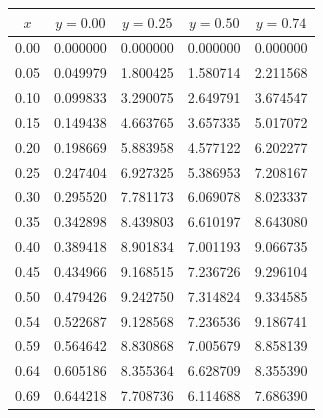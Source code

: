 \documentclass[aps,amsmath,amssymb,floatfix]{revtex4}
\begin{document}
\begin{enumerate}
\begin{enumerate}
\begin{table}[H]
\begin{tabular}{|c|c|c|c|c|}
	      	      		\textbf{$x$} & \textbf{$y = 0.00$} & \textbf{$y = 0.25$} & \textbf{$y = 0.50$} & \textbf{$y = 0.74$} \\ \hline
	      	      		0.00& 0.000000            & 0.000000            & 0.000000            & 0.000000\\ \hline
	      	      		0.05         & 0.049979            & 1.800425            & 1.580714            & 2.211568            \\ \hline
	      	      		0.10         & 0.099833            & 3.290075            & 2.649791            & 3.674547            \\ \hline
	      	      		0.15         & 0.149438            & 4.663765            & 3.657335            & 5.017072            \\ \hline
	      	      		0.20         & 0.198669            & 5.883958            & 4.577122            & 6.202277            \\ \hline
	      	      		0.25         & 0.247404            & 6.927325            & 5.386953            & 7.208167            \\ \hline
	      	      		0.30         & 0.295520            & 7.781173            & 6.069078            & 8.023337            \\ \hline
	      	      		0.35         & 0.342898            & 8.439803            & 6.610197            & 8.643080            \\ \hline
	      	      		0.40         & 0.389418            & 8.901834            & 7.001193            & 9.066735            \\ \hline
	      	      		0.45         & 0.434966            & 9.168515            & 7.236726            & 9.296104            \\ \hline
	      	      		0.50         & 0.479426            & 9.242750            & 7.314824            & 9.334585            \\ \hline
	      	      		0.54         & 0.522687            & 9.128568            & 7.236536            & 9.186741            \\ \hline
	      	      		0.59         & 0.564642            & 8.830868            & 7.005679            & 8.858139            \\ \hline
	      	      		0.64         & 0.605186            & 8.355364            & 6.628709            & 8.355390            \\ \hline
	      	      		0.69         & 0.644218            & 7.708736            & 6.114688            & 7.686390            \\ \hline

\end{tabular}
\end{table}
\end{enumerate}
\end{enumerate}
\end{document}
